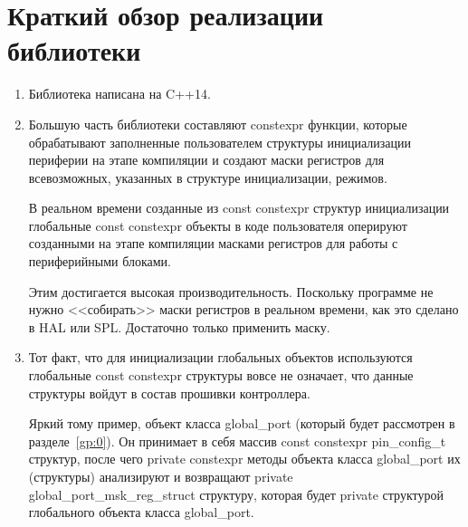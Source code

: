 \section{Краткий обзор реализации библиотеки}
\begin{enumerate}
	\item Библиотека написана на C++14. 
	\item Большую часть библиотеки составляют constexpr функции, которые обрабатывают заполненные пользователем структуры инициализации периферии на этапе компиляции и создают маски регистров для всевозможных, указанных в структуре инициализации, режимов.
	
	В реальном времени созданные из const constexpr структур инициализации глобальные const constexpr объекты в коде пользователя оперируют созданными на этапе компиляции масками регистров для работы с периферийными блоками.
	
	Этим достигается высокая производительность. Поскольку программе не нужно <<собирать>> маски регистров в реальном времени, как это сделано в HAL или SPL. Достаточно только применить маску.
	\item Тот факт, что для инициализации глобальных объектов используются глобальные const constexpr структуры вовсе не означает, что данные структуры войдут в состав прошивки контроллера.
	
	Яркий тому пример, объект класса global\_\-port (который будет рассмотрен в разделе~\ref{gp:0}). Он принимает в себя массив const constexpr pin\_config\_t структур, после чего private constexpr методы объекта класса global\_\-port их (структуры) анализируют и возвращают private global\_\-port\_\-msk\_\-reg\_\-struct структуру, которая будет private структурой глобального объекта класса global\_\-port.
	

\end{enumerate}
